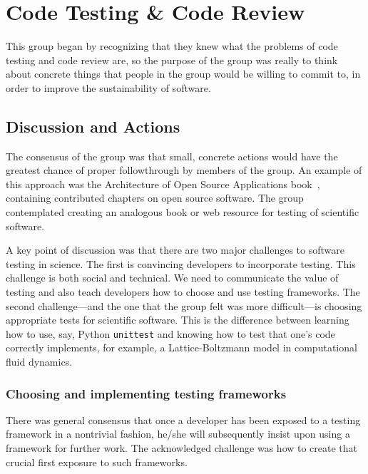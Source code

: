 \documentclass[11pt, oneside]{amsart}
\newcommand{\todo}[1]{{\color{blue}$\blacksquare$~\textsf{[TODO: #1]}}}
\newcommand{\note}[1]{ {\textcolor{blueish}    { ***Note:      #1 }}}
\begin{document}
\section{Code Testing \& Code Review} \label{sec:code_testing}


This group began by recognizing that they knew what the problems of code testing and code
review are, so the purpose of the group was really to think about
concrete things that people in the group would be willing to commit to, in order
to improve the sustainability of software.

\subsection{Discussion and Actions}

The consensus of the group was that small, concrete actions would have the
greatest chance of proper followthrough by members of the group. An example of
this approach was the Architecture of Open Source Applications book~\cite{aosa},
containing contributed chapters on open source software. The group contemplated
creating an analogous book or web resource for testing of scientific software.

A key point of discussion was that there are two major challenges to software
testing in science. The first is convincing developers to incorporate testing.
This challenge is both social and technical. We need to communicate the value of
testing and also teach developers how to choose and use testing frameworks. The
second challenge---and the one that the group felt was more difficult---is
choosing appropriate tests for scientific software. This is the difference
between learning how to use, say, Python \texttt{unittest} and knowing how to test
that one's code correctly implements, for example, a Lattice-Boltzmann model in
computational fluid dynamics.

\subsubsection{Choosing and implementing testing frameworks} There was general
consensus that once a developer has been exposed to a testing framework in a
nontrivial fashion, he/she will subsequently insist upon using a framework for
further work. The acknowledged challenge was how to create that crucial first
exposure to such frameworks.
\end{document}
